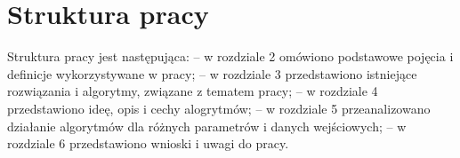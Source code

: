 \section{Struktura pracy}
\label{c14}   
Struktura pracy jest następująca:\newline
-- w rozdziale 2 omówiono podstawowe pojęcia i definicje wykorzystywane w pracy;\newline
-- w rozdziale 3 przedstawiono istniejące rozwiązania i algorytmy, związane z tematem pracy;\newline
-- w rozdziale 4 przedstawiono ideę, opis i cechy alogrytmów;\newline
-- w rozdziale 5 przeanalizowano działanie algorytmów dla różnych parametrów i danych wejściowych;\newline
-- w rozdziale 6 przedstawiono wnioski i uwagi do pracy.